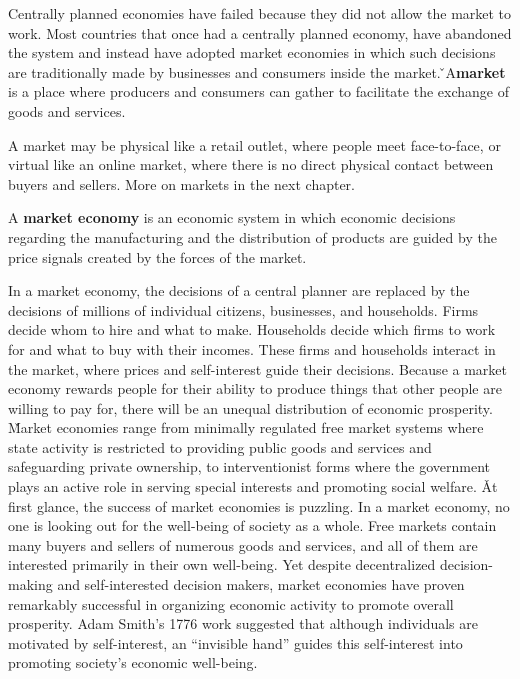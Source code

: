 Centrally planned economies have failed because they did not allow the market to work. Most countries that once had a
centrally planned economy, have abandoned the system and instead have adopted market economies in which such decisions
are traditionally made by businesses and consumers inside the market. \v

\bd[Market]
A\textbf{market} is a place where producers and consumers can gather to facilitate the exchange of goods and services.
\ed

A market may be physical like a retail outlet, where people meet face-to-face, or virtual like an online market, where
there is no direct physical contact between buyers and sellers. More on markets in the next chapter.

A \textbf{market economy} is an economic system in which economic decisions regarding the manufacturing and the
distribution of products are guided by the price signals created by the forces of the market.
\ed

In a market economy, the decisions of a central planner are replaced by the decisions of millions of individual
citizens, businesses, and households. Firms decide whom to hire and what to make. Households decide which firms to
work for and what to buy with their incomes. These firms and households interact in the market, where prices and
self-interest guide their decisions. Because a market economy rewards people for their ability to produce things that
other people are willing to pay for, there will be an unequal distribution of economic prosperity. \v

Market economies range from minimally regulated free market systems where state activity is restricted to providing
public goods and services and safeguarding private ownership, to interventionist forms where the government plays an
active role in serving special interests and promoting social welfare. \v

At first glance, the success of market economies is puzzling. In a market economy, no one is looking out for the
well-being of society as a whole. Free markets contain many buyers and sellers of numerous goods and services, and
all of them are interested primarily in their own well-being. Yet despite decentralized decision-making and
self-interested decision makers, market economies have proven remarkably successful in organizing economic activity
to promote overall prosperity. Adam Smith's 1776 work suggested that although individuals are motivated by
self-interest, an ``invisible hand'' guides this self-interest into promoting society's economic well-being.

